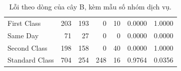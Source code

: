 \begin{table}[!htbp]\centering
\caption{Lỗi theo dòng của cây B, kèm mẫu số nhóm dịch vụ.}\label{tab:shipping-errors}
\begin{tabularx}{\linewidth}{|Y|r|r|r|r|r|r|}\hline
{} &  &  &  &  &  &  \\\hline
First Class & 203 & 193 & 0 & 10 & 0.0000 & 1.0000 \\
Same Day & 71 & 27 & 0 & 0 & 0.0000 & 0.0000 \\
Second Class & 198 & 158 & 0 & 40 & 0.0000 & 1.0000 \\
Standard Class & 704 & 254 & 248 & 16 & 0.9764 & 0.0356 \\
\hline\end{tabularx}
\end{table}
